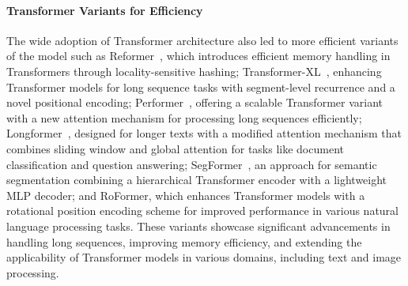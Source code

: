 \documentclass{article}
\begin{document}
\paragraph{Transformer Variants for Efficiency}
The wide adoption of Transformer architecture also led to more efficient variants of the model such as Reformer~\cite{kitaev2019reformer},
which introduces efficient memory handling in Transformers through locality-sensitive hashing; Transformer-XL~\cite{dai2019transformer},
enhancing Transformer models for long sequence tasks with segment-level recurrence and a novel positional encoding;
Performer~\cite{choromanski2020rethinking}, offering a scalable Transformer variant with a new attention mechanism for processing long sequences efficiently;
Longformer~\cite{beltagy2020longformer}, designed for longer texts with a modified attention mechanism that combines sliding window and global attention for tasks like document classification and question answering;
SegFormer~\cite{xie2021segformer}, an approach for semantic segmentation combining a hierarchical Transformer encoder with a lightweight MLP decoder; and
RoFormer\cite{su2023roformer}, which enhances Transformer models with a rotational position encoding scheme for improved performance in various natural language processing tasks.
These variants showcase significant advancements in handling long sequences,
improving memory efficiency, and extending the applicability of Transformer models in various domains, including text and image processing.



\end{document}
